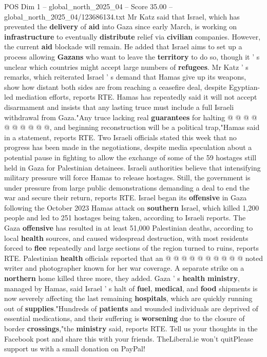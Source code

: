 \begin{textsample}{POS Dim 1 – global\_north\_2025\_04 – Score 35.00 – global\_north\_2025\_04/123686134.txt}
Mr Katz said that Israel, which has prevented the \textbf{delivery} of \textbf{aid} into Gaza since early March, is working on \textbf{infrastructure} to eventually \textbf{distribute} relief via \textbf{civilian} companies.
However, the current \textbf{aid} blockade will remain.
He added that Israel aims to set up a process allowing \textbf{Gazans} who want to leave the \textbf{territory} to do so, though it ' s unclear which countries might accept large numbers of \textbf{refugees}.
Mr Katz ' s remarks, which reiterated Israel ' s demand that Hamas give up its weapons, show how distant both sides are from reaching a ceasefire deal, despite Egyptian-led mediation efforts, reports RTE.
Hamas has repeatedly said it will not accept disarmament and insists that any lasting truce must include a full Israeli withdrawal from Gaza."Any truce lacking real \textbf{guarantees} for halting @ @ @ @ @ @ @ @ @ @, and beginning reconstruction will be a political trap,"Hamas said in a statement, reports RTE.
Two Israeli officials stated this week that no progress has been made in the negotiations, despite media speculation about a potential pause in fighting to allow the exchange of some of the 59 hostages still held in Gaza for Palestinian detainees.
Israeli authorities believe that intensifying military pressure will force Hamas to release hostages.
Still, the government is under pressure from large public demonstrations demanding a deal to end the war and secure their return, reports RTE.
Israel began its \textbf{offensive} in Gaza following the October 2023 Hamas attack on \textbf{southern} Israel, which killed 1,200 people and led to 251 hostages being taken, according to Israeli reports.
The Gaza \textbf{offensive} has resulted in at least 51,000 Palestinian deaths, according to local \textbf{health} sources, and caused widespread destruction, with most residents forced to \textbf{flee} repeatedly and large sections of the region turned to ruins, reports RTE.
Palestinian \textbf{health} officials reported that an @ @ @ @ @ @ @ @ @ @ noted writer and photographer known for her war coverage.
A separate strike on a \textbf{northern} home killed three more, they added.
Gaza ' s \textbf{health} \textbf{ministry}, managed by Hamas, said Israel ' s halt of \textbf{fuel}, \textbf{medical}, and \textbf{food} shipments is now severely affecting the last remaining \textbf{hospitals}, which are quickly running out of \textbf{supplies}."Hundreds of \textbf{patients} and wounded individuals are deprived of essential medications, and their suffering is \textbf{worsening} due to the closure of border \textbf{crossings},"the \textbf{ministry} said, reports RTE.
Tell us your thoughts in the Facebook post and share this with your friends.
TheLiberal.ie won't quitPlease support us with a small donation on PayPal!

\end{textsample}
